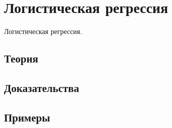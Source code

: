 
\section{Логистическая регрессия}
\label{sec:1.4.05-logistic-regression}

\begin{ticket}
Логистическая регрессия.
\end{ticket}

\subsection*{Теория}

\subsection*{Доказательства}

\subsection*{Примеры}
